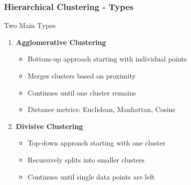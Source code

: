 \documentclass[aspectratio=169]{beamer}
\begin{document}
\begin{frame}
    \frametitle{Hierarchical Clustering - Types}
    \begin{block}{Two Main Types}
        \begin{enumerate}
            \item \textbf{Agglomerative Clustering}
            \begin{itemize}
                \item Bottom-up approach starting with individual points
                \item Merges clusters based on proximity
                \item Continues until one cluster remains
                \item Distance metrics: Euclidean, Manhattan, Cosine
            \end{itemize}

            \item \textbf{Divisive Clustering}
            \begin{itemize}
                \item Top-down approach starting with one cluster
                \item Recursively splits into smaller clusters
                \item Continues until single data points are left
            \end{itemize}
        \end{enumerate}
    \end{block}
\end{frame}
\end{document}
